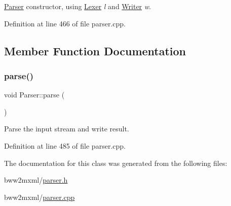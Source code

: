 \hyperlink{class_bww_1_1_parser}{Parser} constructor, using \hyperlink{class_bww_1_1_lexer}{Lexer} {\itshape l} and \hyperlink{class_bww_1_1_writer}{Writer} {\itshape w}. 

Definition at line 466 of file parser.\+cpp.



\subsection{Member Function Documentation}
\mbox{\label{class_bww_1_1_parser_ad941a297e9f6abb39271090806a6be33}} 
\subsubsection{\texorpdfstring{parse()}{parse()}}
{\footnotesize\ttfamily void Parser\+::parse (\begin{DoxyParamCaption}{ }\end{DoxyParamCaption})}

Parse the input stream and write result. 

Definition at line 485 of file parser.\+cpp.



The documentation for this class was generated from the following files\+:\begin{DoxyCompactItemize}
\item 
bww2mxml/\hyperlink{bww2mxml_2parser_8h}{parser.\+h}\item 
bww2mxml/\hyperlink{parser_8cpp}{parser.\+cpp}\end{DoxyCompactItemize}
